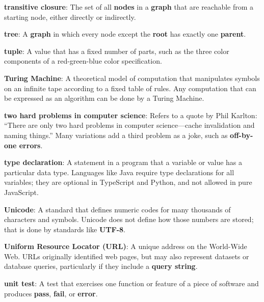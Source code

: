 \documentclass[krantzl]{krantz}
\newcommand{\glosskey}[1]{\textbf{#1}}
\begin{document}
\noindent \textbf{{\newline}\glosskey{transitive closure}}: 
The set of all \glosskey{nodes} in a \glosskey{graph} that are reachable from a starting node, either directly or indirectly.


\noindent \textbf{{\newline}\glosskey{tree}}: 
A \glosskey{graph} in which every node except the \glosskey{root} has exactly one \glosskey{parent}.


\noindent \textbf{{\newline}\glosskey{tuple}}: 
A value that has a fixed number of parts, such as the three color components of a red-green-blue color specification.


\noindent \textbf{{\newline}\glosskey{Turing Machine}}: 
A theoretical model of computation that manipulates symbols on an infinite tape according to a fixed table of rules. Any computation that can be expressed as an algorithm can be done by a Turing Machine.


\noindent \textbf{{\newline}\glosskey{two hard problems in computer science}}: 
Refers to a quote by Phil Karlton: “There are only two hard problems in computer science—cache invalidation and naming things.” Many variations add a third problem as a joke, such as \glosskey{off-by-one errors}.


\noindent \textbf{{\newline}\glosskey{type declaration}}: 
A statement in a program that a variable or value has a particular data type. Languages like Java require type declarations for all variables; they are optional in TypeScript and Python, and not allowed in pure JavaScript.


\noindent \textbf{{\newline}\glosskey{Unicode}}: 
A standard that defines numeric codes for many thousands of characters and symbols. Unicode does not define how those numbers are stored; that is done by standards like \glosskey{UTF-8}.


\noindent \textbf{{\newline}\glosskey{Uniform Resource Locator} (URL)}: 
A unique address on the World-Wide Web. URLs originally identified web pages, but may also represent datasets or database queries, particularly if they include a \glosskey{query string}.


\noindent \textbf{{\newline}\glosskey{unit test}}: 
A test that exercises one function or feature of a piece of software and produces \glosskey{pass}, \glosskey{fail}, or \glosskey{error}.
\end{document}
